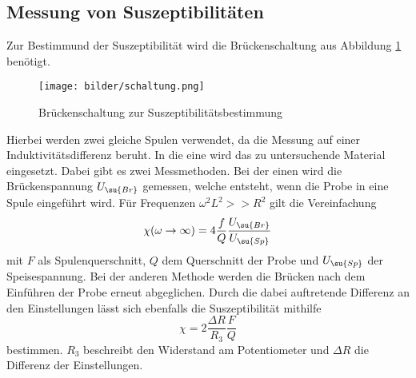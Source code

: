 \subsection{Messung von Suszeptibilitäten}
Zur Bestimmund der Suszeptibilität wird die Brückenschaltung aus Abbildung
\ref{fig:schaltung} benötigt.
\begin{figure}
  \centering
  \texttt{[image: bilder/schaltung.png]}
  \caption{Brückenschaltung zur Suszeptibilitätsbestimmung \cite{606}}
  \label{fig:schaltung}
\end{figure}
Hierbei werden zwei gleiche Spulen verwendet, da die Messung auf einer
Induktivitätsdifferenz beruht. In die eine wird das zu untersuchende
Material eingesetzt. Dabei gibt es zwei Messmethoden. Bei der einen wird die
Brückenspannung $U_\su{Br}$ gemessen, welche entsteht, wenn die Probe in eine
Spule eingeführt wird. Für Frequenzen $\omega^2L^2 >>R^2$ gilt die Vereinfachung
\begin{equation}
 \chi (\omega \to \infty) = 4 \frac{f}{Q}\frac{U_\su{Br}}{U_\su{Sp}}
\end{equation}
mit $F$ als Spulenquerschnitt, $Q$ dem Querschnitt der Probe und $U_\su{Sp}$ der
Speisespannung.
Bei der anderen Methode werden die Brücken nach dem Einführen der Probe erneut
abgeglichen. Durch die dabei auftretende Differenz an den Einstellungen
lässt sich ebenfalls die Suszeptibilität mithilfe
\begin{equation}
 \chi = 2\frac{\Delta R}{R_3}\frac{F}{Q}
\end{equation}
bestimmen. $R_3$ beschreibt den Widerstand am Potentiometer und $\Delta R$ die
Differenz der Einstellungen.
